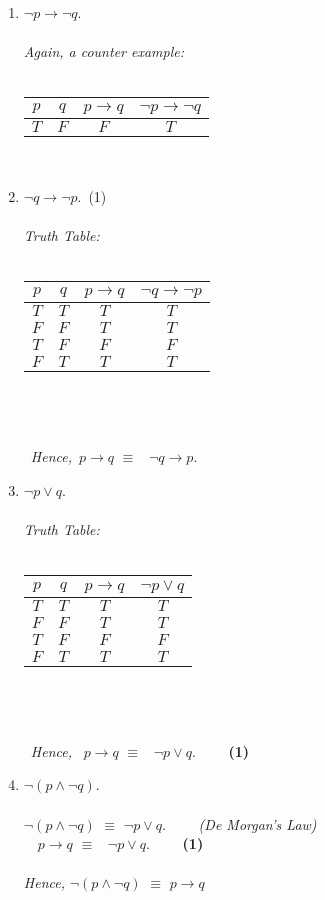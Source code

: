 \documentclass[12pt,fleqn]{article}
\begin{document}
\begin{enumerate}
\begin{enumerate}
\item \space $\neg p \rightarrow \neg q$.\\\\
\textit{Again, a counter example:}\\\\
\begin{tabular}{ c | c | c | c }
  $p$ & $q$ & $p \rightarrow q$ & $\neg p \rightarrow \neg q$ \\ \hline
  $T$ & $F$ & $F$ & $T$ 
\end{tabular}\\


\item \space $\neg q \rightarrow \neg p$.\ (1) \\\\
\textit{Truth Table:}\\\\
\begin{tabular}{ c | c | c | c }
  $p$ & $q$ & $p \rightarrow q$ & $\neg q \rightarrow \neg p$ \\ \hline
  $T$ & $T$ & $T$ & $T$\\ \hline
  $F$ & $F$ & $T$ & $T$\\ \hline
  $T$ & $F$ & $F$ & $F$\\ \hline
  $F$ & $T$ & $T$ & $T$\\    
\end{tabular}\\\\\\\ \textit{Hence,}\ $p \rightarrow q$ $\equiv$ \  
$\neg q \rightarrow p.$

\item \space $\neg p \vee q$.\\\\
\textit{Truth Table:}\\\\
\begin{tabular}{ c | c | c | c }
  $p$ & $q$ & $p \rightarrow q$ & $\neg p \vee q$ \\ \hline
  $T$ & $T$ & $T$ & $T$\\ \hline
  $F$ & $F$ & $T$ & $T$\\ \hline
  $T$ & $F$ & $F$ & $F$\\ \hline
  $F$ & $T$ & $T$ & $T$\\    
\end{tabular}\\\\\\\ \textit{Hence, }\ $p \rightarrow q$ $\equiv$ \  $\neg p \vee q.$ \ \ \ \  \textbf{(1)}
\item \space $\neg (p \wedge \neg q)$.\\\\ 
$\neg (p \wedge \neg q)$ $\equiv$  $\neg p \vee q.$ \ \ \ \ \textit{(De Morgan's Law)}\\
\ \  $p \rightarrow q$ $\equiv$ \  $\neg p \vee q.$ \ \ \ \  \textbf{(1)}\\\\
\textit{Hence,} $\neg (p \wedge \neg q)$ $\equiv$ $p \rightarrow q$\\


\end{enumerate}
\end{enumerate}
\end{document}
